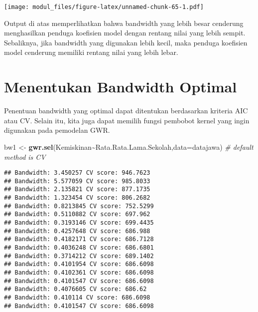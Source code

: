 \documentclass[
]{book}
\newenvironment{Shaded}{\begin{snugshade}}{\end{snugshade}}
\newcommand{\CommentTok}[1]{\textcolor[rgb]{0.56,0.35,0.01}{\textit{#1}}}
\newcommand{\DataTypeTok}[1]{\textcolor[rgb]{0.13,0.29,0.53}{#1}}
\newcommand{\KeywordTok}[1]{\textcolor[rgb]{0.13,0.29,0.53}{\textbf{#1}}}
\newcommand{\NormalTok}[1]{#1}
\newcommand{\OperatorTok}[1]{\textcolor[rgb]{0.81,0.36,0.00}{\textbf{#1}}}
\newcommand{\StringTok}[1]{\textcolor[rgb]{0.31,0.60,0.02}{#1}}
\begin{document}
\begin{Shaded}
\end{Shaded}

\texttt{[image: modul\_files/figure-latex/unnamed-chunk-65-1.pdf]}

Output di atas memperlihatkan bahwa bandwidth yang lebih besar cenderung menghasilkan penduga koefisien model dengan rentang nilai yang lebih sempit. Sebaliknya, jika bandwidth yang digunakan lebih kecil, maka penduga koefisien model cenderung memiliki rentang nilai yang lebih lebar.

\hypertarget{menentukan-bandwidth-optimal}{%
\section{Menentukan Bandwidth Optimal}\label{menentukan-bandwidth-optimal}}

Penentuan bandwidth yang optimal dapat ditentukan berdasarkan kriteria AIC atau CV. Selain itu, kita juga dapat memilih fungsi pembobot kernel yang ingin digunakan pada pemodelan GWR.

\begin{Shaded}
\begin{Highlighting}[]
\NormalTok{bw1 \textless{}{-}}\StringTok{ }\KeywordTok{gwr.sel}\NormalTok{(Kemiskinan}\OperatorTok{\textasciitilde{}}\NormalTok{Rata.Rata.Lama.Sekolah,}\DataTypeTok{data=}\NormalTok{datajawa) }\CommentTok{\# default method is CV}
\end{Highlighting}
\end{Shaded}

\begin{verbatim}
## Bandwidth: 3.450257 CV score: 946.7623 
## Bandwidth: 5.577059 CV score: 985.8033 
## Bandwidth: 2.135821 CV score: 877.1735 
## Bandwidth: 1.323454 CV score: 806.2682 
## Bandwidth: 0.8213845 CV score: 752.5299 
## Bandwidth: 0.5110882 CV score: 697.962 
## Bandwidth: 0.3193146 CV score: 699.4435 
## Bandwidth: 0.4257648 CV score: 686.988 
## Bandwidth: 0.4182171 CV score: 686.7128 
## Bandwidth: 0.4036248 CV score: 686.6801 
## Bandwidth: 0.3714212 CV score: 689.1402 
## Bandwidth: 0.4101954 CV score: 686.6098 
## Bandwidth: 0.4102361 CV score: 686.6098 
## Bandwidth: 0.4101547 CV score: 686.6098 
## Bandwidth: 0.4076605 CV score: 686.62 
## Bandwidth: 0.410114 CV score: 686.6098 
## Bandwidth: 0.4101547 CV score: 686.6098
\end{verbatim}
\end{document}
